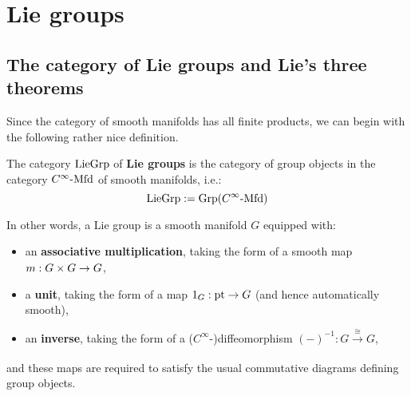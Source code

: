 \section{Lie groups}
    \subsection{The category of Lie groups and Lie's three theorems}
        Since the category of smooth manifolds has all finite products, we can begin with the following rather nice definition.
        \begin{definition} \label{def: lie_groups}
            The category $\mathrm{Lie}\mathrm{Grp}$ of \textbf{Lie groups} is the category of group objects in the category $C^{\infty}\text{-}\mathrm{Mfd}$ of smooth manifolds, i.e.:
                $$\mathrm{Lie}\mathrm{Grp} := \mathrm{Grp}( C^{\infty}\text{-}\mathrm{Mfd} )$$
        \end{definition}
        In other words, a Lie group is a smooth manifold $G$ equipped with:
        \begin{itemize}
            \item an \textbf{associative multiplication}, taking the form of a smooth map $m: G \x G \to G$,
            \item a \textbf{unit}, taking the form of a map $1_G: \mathrm{pt} \to G$ (and hence automatically smooth),
            \item an \textbf{inverse}, taking the form of a ($C^{\infty}$-)diffeomorphism $(-)^{-1}: G \xrightarrow[]{\cong} G$,
        \end{itemize}
        and these maps are required to satisfy the usual commutative diagrams defining group objects.

